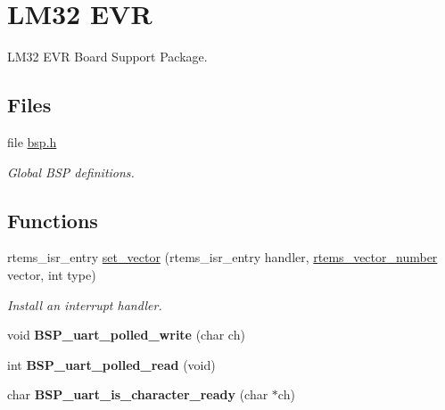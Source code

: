 \hypertarget{group__RTEMSBSPsLM32EVR}{}\section{L\+M32 E\+VR}
\label{group__RTEMSBSPsLM32EVR}


L\+M32 E\+VR Board Support Package.  


\subsection*{Files}
\begin{DoxyCompactItemize}
\item 
file \mbox{\hyperlink{bsps_2lm32_2lm32__evr_2include_2bsp_8h}{bsp.\+h}}
\begin{DoxyCompactList}\small\item\em Global B\+SP definitions. \end{DoxyCompactList}\end{DoxyCompactItemize}
\subsection*{Functions}
\begin{DoxyCompactItemize}
\item 
rtems\+\_\+isr\+\_\+entry \mbox{\hyperlink{group__RTEMSBSPsLM32EVR_gab3388042c56b34c40be81fd5f028d97e}{set\+\_\+vector}} (rtems\+\_\+isr\+\_\+entry handler, \mbox{\hyperlink{group__ClassicINTR_ga3e434c197d99f128e78cae4d9358bd8b}{rtems\+\_\+vector\+\_\+number}} vector, int type)
\begin{DoxyCompactList}\small\item\em Install an interrupt handler. \end{DoxyCompactList}\item 
\mbox{\label{group__RTEMSBSPsLM32EVR_gaea0a9525068aa61412d054bae150c639}} 
void {\bfseries B\+S\+P\+\_\+uart\+\_\+polled\+\_\+write} (char ch)
\item 
\mbox{\label{group__RTEMSBSPsLM32EVR_ga59450169aa9e9c300e06c6ff87080ea8}} 
int {\bfseries B\+S\+P\+\_\+uart\+\_\+polled\+\_\+read} (void)
\item 
\mbox{\label{group__RTEMSBSPsLM32EVR_ga16c44397d75f501b80bb98e65ded7d63}} 
char {\bfseries B\+S\+P\+\_\+uart\+\_\+is\+\_\+character\+\_\+ready} (char $\ast$ch)
\end{DoxyCompactItemize}


